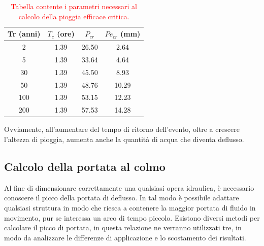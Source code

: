 \begin{table}[H] \centering
    \caption{\textcolor{red}{Tabella contente i parametri necessari al calcolo della pioggia efficace critica.}}
    \begin{tabular}{cccc}
        \toprule
       Tr (anni)& $T_c$ (ore) & $P_{cr}$  & $Pe_{cr}$ (mm) \\
        \midrule
        2  & 1.39     & 26.50 & 2.64       \\
        5    & 1.39     & 33.64 & 4.64       \\
        30  & 1.39     & 45.50 & 8.93       \\
        50  & 1.39     & 48.76 & 10.29      \\
        100 & 1.39     & 53.15 & 12.23      \\
        200 & 1.39     & 57.53 & 14.28      \\
        \bottomrule
\end{tabular}
\label{parametri_pioggia_efficace}
\end{table}
Ovviamente, all'aumentare del tempo di ritorno dell'evento, oltre a crescere l'altezza di pioggia, aumenta anche la quantità di acqua che diventa deflusso.

\subsection{Calcolo della portata al colmo}
Al fine di dimensionare correttamente una qualsiasi opera idraulica, è necessario conoscere il picco della portata di deflusso. In tal modo è possibile adattare qualsiasi struttura in modo che riesca a contenere la maggior portata di fluido in movimento, pur se interessa un arco di tempo piccolo.
Esistono diversi metodi per calcolare il picco di portata, in questa relazione ne verranno utilizzati tre, in modo da analizzare le differenze di applicazione e lo scostamento dei risultati.
